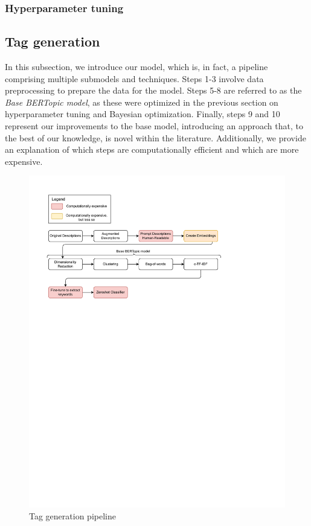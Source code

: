 \subsubsection{Hyperparameter tuning}

\subsection{Tag generation}
In this subsection, we introduce our model, which is, in fact, a pipeline comprising multiple submodels and techniques. Steps 1-3 involve data preprocessing to prepare the data for the model. Steps 5-8 are referred to as the \textit{Base BERTopic model}, as these were optimized in the previous section on hyperparameter tuning and Bayesian optimization. Finally, steps 9 and 10 represent our improvements to the base model, introducing an approach that, to the best of our knowledge, is novel within the literature. Additionally, we provide an explanation of which steps are computationally efficient and which are more expensive.

\begin{figure}[h]
    \centering
    \includegraphics[width=\textwidth]{figures/tag_generation_pipeline.pdf}
    \caption{Tag generation pipeline}
    \label{fig:tag_generation_pipeline}
\end{figure}

